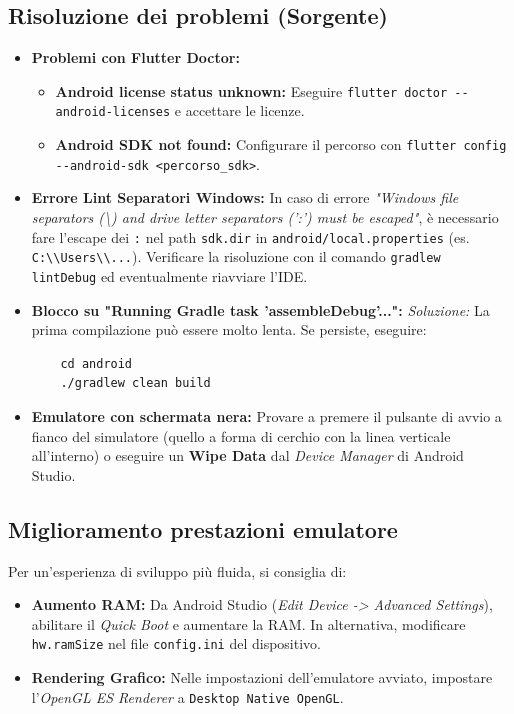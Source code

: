 \documentclass[a4paper,12pt]{article}
\begin{document}
\subsection{Risoluzione dei problemi (Sorgente)} \label{subsec:risoluzione_sorgente}
\begin{itemize}
    \item \textbf{Problemi con Flutter Doctor:}
    \begin{itemize}
        \item \textbf{Android license status unknown:} Eseguire \texttt{flutter doctor {-}{-}android-licenses} e accettare le licenze.
        \item \textbf{Android SDK not found:} Configurare il percorso con \texttt{flutter config {-}{-}android-sdk <percorso\_sdk>}.
    \end{itemize}
    \item \textbf{Errore Lint Separatori Windows:}
    In caso di errore \textit{"Windows file separators (\textbackslash) and drive letter separators (':') must be escaped"}, è necessario fare l'escape dei \texttt{:} nel path \texttt{sdk.dir} in \texttt{android/local.properties} (es. \texttt{C:\textbackslash\textbackslash Users\textbackslash\textbackslash...}). Verificare la risoluzione con il comando \texttt{gradlew lintDebug} ed eventualmente riavviare l'IDE.
    \item \textbf{Blocco su "Running Gradle task 'assembleDebug'...":}
    \textit{Soluzione:} La prima compilazione può essere molto lenta. Se persiste, eseguire:
    \begin{verbatim}
    cd android
    ./gradlew clean build
    \end{verbatim}
    \item \textbf{Emulatore con schermata nera:}
    Provare a premere il pulsante di avvio a fianco del simulatore (quello a forma di cerchio con la linea verticale all'interno) o eseguire un \textbf{Wipe Data} dal \textit{Device Manager} di Android Studio.
\end{itemize}

\subsection{Miglioramento prestazioni emulatore} \label{subsec:prestazioni_emulatore}
Per un'esperienza di sviluppo più fluida, si consiglia di:
\begin{itemize}
    \item \textbf{Aumento RAM:} Da Android Studio (\textit{Edit Device -> Advanced Settings}), abilitare il \textit{Quick Boot} e aumentare la RAM. In alternativa, modificare \texttt{hw.ramSize} nel file \texttt{config.ini} del dispositivo.
    \item \textbf{Rendering Grafico:} Nelle impostazioni dell'emulatore avviato, impostare l'\textit{OpenGL ES Renderer} a \texttt{Desktop Native OpenGL}.
\end{itemize}
\end{document}
